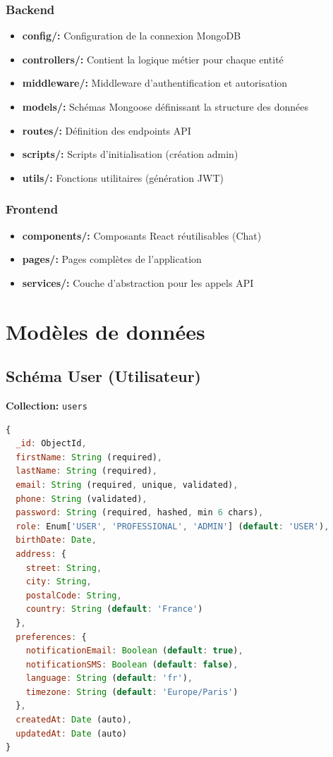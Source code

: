 \documentclass[12pt,a4paper]{article}
\begin{document}
\subsubsection{Backend}

\begin{itemize}
    \item \textbf{config/:} Configuration de la connexion MongoDB
    \item \textbf{controllers/:} Contient la logique métier pour chaque entité
    \item \textbf{middleware/:} Middleware d'authentification et autorisation
    \item \textbf{models/:} Schémas Mongoose définissant la structure des données
    \item \textbf{routes/:} Définition des endpoints API
    \item \textbf{scripts/:} Scripts d'initialisation (création admin)
    \item \textbf{utils/:} Fonctions utilitaires (génération JWT)
\end{itemize}

\subsubsection{Frontend}

\begin{itemize}
    \item \textbf{components/:} Composants React réutilisables (Chat)
    \item \textbf{pages/:} Pages complètes de l'application
    \item \textbf{services/:} Couche d'abstraction pour les appels API
\end{itemize}

\section{Modèles de données}

\subsection{Schéma User (Utilisateur)}

\textbf{Collection:} \texttt{users}

\begin{lstlisting}[language=JavaScript,caption=Modèle User]
{
  _id: ObjectId,
  firstName: String (required),
  lastName: String (required),
  email: String (required, unique, validated),
  phone: String (validated),
  password: String (required, hashed, min 6 chars),
  role: Enum['USER', 'PROFESSIONAL', 'ADMIN'] (default: 'USER'),
  birthDate: Date,
  address: {
    street: String,
    city: String,
    postalCode: String,
    country: String (default: 'France')
  },
  preferences: {
    notificationEmail: Boolean (default: true),
    notificationSMS: Boolean (default: false),
    language: String (default: 'fr'),
    timezone: String (default: 'Europe/Paris')
  },
  createdAt: Date (auto),
  updatedAt: Date (auto)
}
\end{lstlisting}
\end{document}
